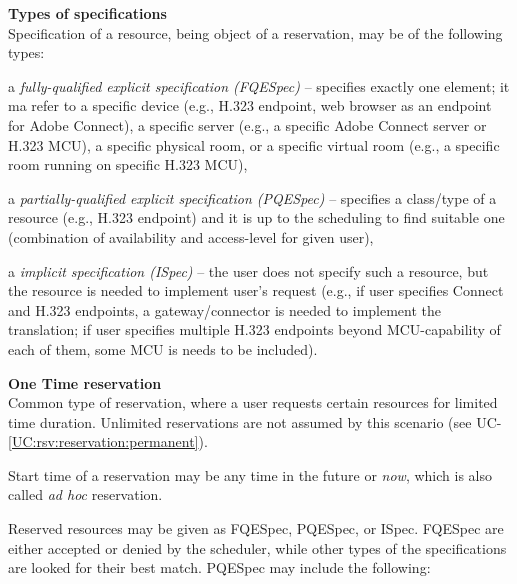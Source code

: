 \documentclass[a4paper]{report}
\makeatletter
\newcounter{UCcounter}
\newenvironment{UseCases}%
	{\begin{list}{\textbf{UC-\arabic{UCcounter}}}{\@nmbrlisttrue\def\@listctr{UCcounter}}}%
	{\end{list}}
\newcommand{\UClabel}[1]{\label{UC:#1}}
\newcommand{\UCref}[1]{UC-\ref{UC:#1}}
\newcommand{\UseCase}[2]{\item\UClabel{#2} \textbf{#1}\\}
\makeatother
\begin{document}
\begin{UseCases}

\UseCase{Types of specifications}{rsv:specifications}

Specification of a resource, being object of a reservation, may be of the
following types:

\begin{compactitem}

\item a \emph{fully-qualified explicit specification (FQESpec)} -- specifies
exactly one element; it ma refer to a specific device (e.g., H.323 endpoint,
web browser as an endpoint for Adobe Connect), a specific server (e.g., a
specific Adobe Connect server or H.323 MCU), a specific physical room, or a
specific virtual room (e.g., a specific room running on specific H.323 MCU),

\item a \emph{partially-qualified explicit specification (PQESpec)} --
specifies a class/type of a resource (e.g., H.323 endpoint) and it is up to the
scheduling to find suitable one (combination of availability and access-level
for given user),

\item a \emph{implicit specification (ISpec)} -- the user does not specify such
a resource, but the resource is needed to implement user's request (e.g., if
user specifies Connect and H.323 endpoints, a gateway/connector is needed to
implement the translation; if user specifies multiple H.323 endpoints beyond
MCU-capability of each of them, some MCU is needs to be included).  

\end{compactitem}


\UseCase{One Time reservation}{rsv:reservation:one}

Common type of reservation, where a user requests certain resources for limited
time duration. Unlimited reservations are not assumed by this scenario (see
\UCref{rsv:reservation:permanent}).

Start time of a reservation may be any time in the future or \emph{now}, which
is also called \emph{ad hoc} reservation.

Reserved resources may be given as FQESpec, PQESpec, or ISpec. FQESpec are
either accepted or denied by the scheduler, while other types of the
specifications are looked for their best match. PQESpec may include the
following:

\begin{compactitem}


\end{compactitem}
\end{UseCases}
\end{document}

